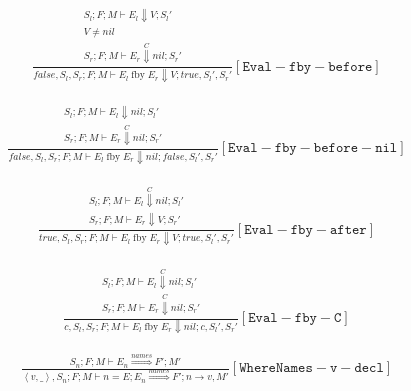 \documentclass{scrartcl}
\DeclareMathOperator{\fby}{fby}
\begin{document}
    \begin{align*}
    \frac{
        \begin{matrix}
        S_l; F; M \vdash E_l \Downarrow V; S_l' \\
        V \neq nil \\
        S_r; F; M \vdash E_r \overset{C}{\Downarrow} nil; S_r'
        \end{matrix}
    }{
        false, S_l, S_r; F; M \vdash E_l \fby E_r \Downarrow V; true, S_l', S_r'
    }[\mathtt{Eval-fby-before}]
    \end{align*}
    
    \begin{align*}
    \frac{
        \begin{matrix}
        S_l; F; M \vdash E_l \Downarrow nil; S_l' \\
        S_r; F; M \vdash E_r \overset{C}{\Downarrow} nil; S_r'
        \end{matrix}
    }{
        false, S_l, S_r; F; M \vdash E_l \fby E_r \Downarrow nil; false, S_l', S_r'
    }[\mathtt{Eval-fby-before-nil}]
    \end{align*}
    
    \begin{align*}
    \frac{
        \begin{matrix}
        S_l; F; M \vdash E_l \overset{C}{\Downarrow} nil; S_l' \\
        S_r; F; M \vdash E_r \Downarrow V; S_r'
        \end{matrix}
    }{
        true, S_l, S_r; F; M \vdash E_l \fby E_r \Downarrow V; true, S_l', S_r'
    }[\mathtt{Eval-fby-after}]
    \end{align*}
    
    \begin{align*}
    \frac{
        \begin{matrix}
        S_l; F; M \vdash E_l \overset{C}{\Downarrow} nil; S_l' \\
        S_r; F; M \vdash E_r \overset{C}{\Downarrow} nil; S_r'
        \end{matrix}
    }{
        c, S_l, S_r; F; M \vdash E_l \fby E_r \Downarrow nil; c, S_l', S_r'
    }[\mathtt{Eval-fby-C}]
    \end{align*}
    
    \begin{align*}
    \frac{
        S_n; F; M \vdash E_n \overset{names}{\Rightarrow} F'; M'
    }{
        \left<v, \_ \right>, S_n; F; M \vdash n = E; E_n \overset{names}{\Rightarrow} F'; n \to v, M'
    }[\mathtt{WhereNames-v-decl}]
    \end{align*}
    
\end{document}
